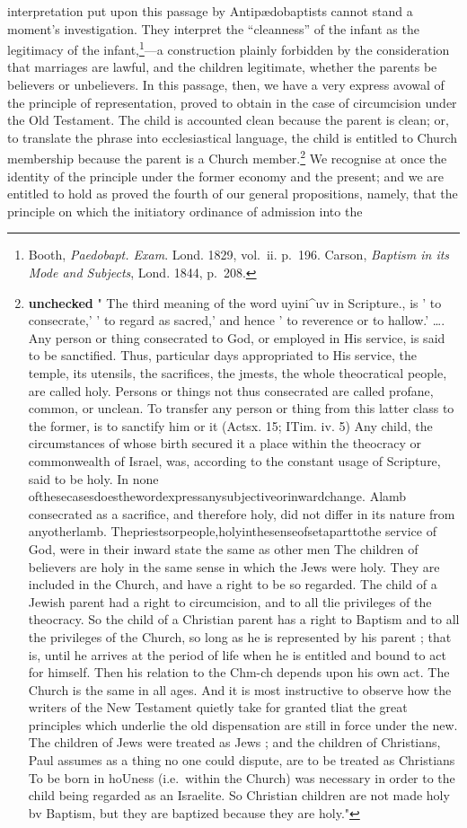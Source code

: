 \documentclass[]{book}
\begin{document}
interpretation put upon this passage by Antipædobaptists cannot stand a moment's investigation. They interpret the ``cleanness'' of the infant as the legitimacy of the infant,\footnote{Booth, \emph{Paedobapt. Exam}. Lond. 1829, vol.~ii. p.~196. Carson, \emph{Baptism in its Mode and Subjects}, Lond. 1844, p.~208.}---a construction plainly forbidden by the consideration that marriages are lawful, and the children legitimate, whether the parents be believers or unbelievers. In this passage, then, we have a very express avowal of the principle of representation, proved to obtain in the case of circumcision under the Old Testament. The child is accounted clean because the parent is clean; or, to translate the phrase into ecclesiastical language, the child is entitled to Church membership because the parent is a Church member.\footnote{\textbf{unchecked} " The third meaning of the word uyini\^{}uv in Scripture., is ' to consecrate,' ' to regard as sacred,' and hence ' to reverence or to hallow.' \ldots{}. Any person or thing consecrated to God, or employed in His service, is said to be sanctified. Thus, particular days appropriated to His service, the temple, its utensils, the sacrifices, the jmests, the whole theocratical people, are called holy. Persons or things not thus consecrated are called profane, common, or unclean. To transfer any person or thing from this latter class to the former, is to sanctify him or it (Actsx. 15; ITim. iv. 5) Any child, the circumstances of whose birth secured it a place within the theocracy or commonwealth of Israel, was, according to the constant usage of Scripture, said to be holy. In none ofthesecasesdoesthewordexpressanysubjectiveorinwardchange. Alamb consecrated as a sacrifice, and therefore holy, did not differ in its nature from anyotherlamb. Thepriestsorpeople,holyinthesenseofsetaparttothe service of God, were in their inward state the same as other men The children of believers are holy in the same sense in which the Jews were holy. They are included in the Church, and have a right to be so regarded. The child of a Jewish parent had a right to circumcision, and to all tlie privileges of the theocracy. So the child of a Christian parent has a right to Baptism and to all the privileges of the Church, so long as he is represented by his parent ; that is, until he arrives at the period of life when he is entitled and bound to act for himself. Then his relation to the Chm-ch depends upon his own act. The Church is the same in all ages. And it is most instructive to observe how the writers of the New Testament quietly take for granted tliat the great principles which underlie the old dispensation are still in force under the new. The children of Jews were treated as Jews ; and the children of Christians, Paul assumes as a thing no one could dispute, are to be treated as Christians To be born in hoUness (i.e.~within the Church) was necessary in order to the child being regarded as an Israelite. So Christian children are not made holy bv Baptism, but they are baptized because they are holy."} We recognise at once the identity of the principle under the former economy and the present; and we are entitled to hold as proved the fourth of our general propositions, namely, that the principle on which the initiatory ordinance of admission into the 
\end{document}
